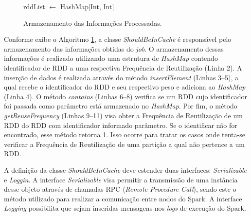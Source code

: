\begin{figure}[!ht]
    \begin{algorithm}[H]
    \caption{Armazenamento das Informações Processadas.}
        \label{fig:classe-shouldbeincache}
            
             {
                rddList $\leftarrow$ HashMap[Int, Int]\; 
                
                
                \BlankLine
                
                \BlankLine
            }
    \end{algorithm}
\end{figure}

Conforme exibe o Algoritmo \ref{fig:classe-shouldbeincache}, a classe \textit{ShouldBeInCache} é responsável pelo armazenamento das informações obtidas do \textit{job}. O armazenamento dessas informações é realizado utilizando uma estrutura de \textit{HashMap} contendo identificador de RDD a uma respectiva Frequência de Reutilização (Linha 2). A inserção de dados é realizada através do método \textit{insertElement} (Linhas 3--5), a qual recebe o identificador do RDD e seu respectivo peso e adiciona ao \textit{HashMap} (Linha 4). O método \textit{contains} (Linhas 6--8) verifica se um RDD cujo identificador foi passada como parâmetro está armazenado no \textit{HashMap}. Por fim, o método \textit{getReuseFrequency} (Linhas 9--11) visa obter a Frequência de Reutilização de um RDD do RDD com identificador informado parâmetro. Se o identificar não for encontrado, esse método retorna 1. Isso ocorre para tratar os casos onde tenta-se verificar a Frequência de Reutilização de uma partição a qual não pertence a um RDD.

A definição da classe \textit{ShouldBeInCache} deve estender duas interfaces: \textit{Serializable} e \textit{Loggin}. A interface \textit{Serializable} visa permitir a transmissão de uma instância desse objeto através de chamadas RPC (\textit{Remote Procedure Call}), sendo este o método utilizado para realizar a comunicação entre nodos do Spark. A interface \textit{Logging} possibilita que sejam inseridas mensagens nos \textit{logs} de execução do Spark.

